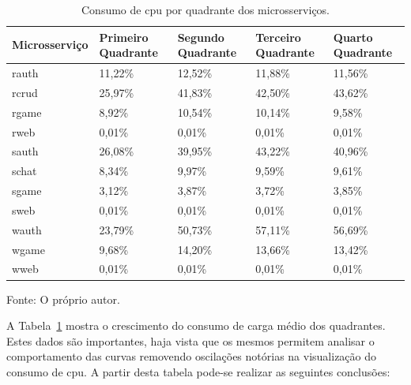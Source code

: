 \begin{table}[htb!]
\centering
\begin{adjustbox}{max width=\textwidth}
\caption{Consumo de \ac{cpu} por quadrante dos microsserviços.}
\label{tab:cpu_microsservicos_media_quadrantes}

\begin{tabular}{|l|l|l|l|l|}
\hline
Microsserviço & Primeiro Quadrante & Segundo Quadrante & Terceiro Quadrante & Quarto Quadrante \\ \hline
rauth         & 11,22\%            & 12,52\%           & 11,88\%            & 11,56\%          \\ \hline
rcrud         & 25,97\%            & 41,83\%           & 42,50\%             & 43,62\%          \\ \hline
rgame         & 8,92\%             & 10,54\%           & 10,14\%            & 9,58\%           \\ \hline
rweb          & 0,01\%             & 0,01\%            & 0,01\%             & 0,01\%           \\ \hline
sauth         & 26,08\%            & 39,95\%           & 43,22\%            & 40,96\%          \\ \hline
schat         & 8,34\%             & 9,97\%            & 9,59\%             & 9,61\%           \\ \hline
sgame         & 3,12\%             & 3,87\%            & 3,72\%             & 3,85\%           \\ \hline
sweb          & 0,01\%             & 0,01\%            & 0,01\%             & 0,01\%           \\ \hline
wauth         & 23,79\%            & 50,73\%           & 57,11\%            & 56,69\%          \\ \hline
wgame         & 9,68\%             & 14,20\%           & 13,66\%            & 13,42\%          \\ \hline
wweb          & 0,01\%             & 0,01\%            & 0,01\%             & 0,01\%           \\ \hline
\end{tabular}
\end{adjustbox}

Fonte: O próprio autor.
\end{table}

A Tabela~\ref{tab:cpu_microsservicos_media_quadrantes} mostra o crescimento do consumo de carga médio dos quadrantes.
%
Estes dados são importantes, haja vista que os mesmos permitem analisar o comportamento das curvas removendo oscilações notórias na visualização do consumo de \ac{cpu}.
%
A partir desta tabela pode-se realizar as seguintes conclusões:

